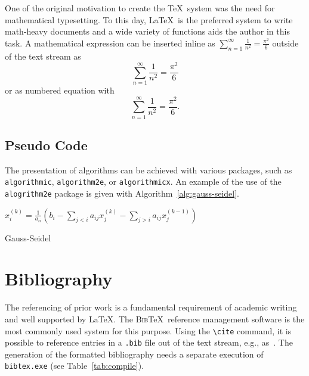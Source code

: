 One of the original motivation to create the \TeX\ system was the need for mathematical typesetting.
To this day, \LaTeX\ is the preferred system to write math-heavy documents and a wide variety of functions aids the author in this task.
A mathematical expression can be inserted inline as $\sum_{n=1}^{\infty} \frac{1}{n^2} = \frac{\pi^2}{6}$ outside of the text stream as \[ \sum_{n=1}^{\infty} \frac{1}{n^2} = \frac{\pi^2}{6} \] or as numbered equation with
\begin{equation}
\sum_{n=1}^{\infty} \frac{1}{n^2} = \frac{\pi^2}{6}.
\end{equation}

\subsection{Pseudo Code}

The presentation of algorithms can be achieved with various packages, such as \verb|algorithmic|, \verb|algorithm2e|, or \verb|algorithmicx|.
An example of the use of the \verb|alogrithm2e| package is given with Algorithm~\ref{alg:gauss-seidel}.

\begin{algorithm}
	{
	   {
	      $x_i^{(k)} = \frac{1}{a_{ii}} \left(b_i-\sum_{j<i} a_{ij} x_j^{(k)} - \sum_{j>i} a_{ij} x_j^{(k-1)} \right)$\;
	   }
	   {\BreakFor\;}
	}
	\caption{Gauss-Seidel}
	\label{alg:gauss-seidel} %
\end{algorithm}

\section{Bibliography}

The referencing of prior work is a fundamental requirement of academic writing and well supported by \LaTeX.
The \textsc{Bib}\TeX\ reference management software is the most commonly used system for this purpose.
Using the \verb|\cite| command, it is possible to reference entries in a \verb|.bib| file out of the text stream, e.g., as~\cite{Turing1936}.
The generation of the formatted bibliography needs a separate execution of \verb|bibtex.exe| (see Table~\ref{tab:compile}).

